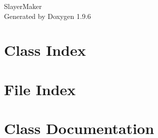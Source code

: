 \documentclass[twoside]{book}
\newcommand{\+}{\discretionary{\mbox{\scriptsize$\hookleftarrow$}}{}{}}
\newcommand{\clearemptydoublepage}{%
    \newpage{\pagestyle{empty}\cleardoublepage}%
  }
\begin{document}
  \raggedbottom
  \begin{titlepage}
  \vspace*{7cm}
  \begin{center}%
  {\Large Slayer\+Maker}\\
  \vspace*{1cm}
  {\large Generated by Doxygen 1.9.6}\\
  \end{center}
  \end{titlepage}
  \clearemptydoublepage
  \tableofcontents
  \clearemptydoublepage
\chapter{Class Index}

\chapter{File Index}

\chapter{Class Documentation}








































\end{document}
